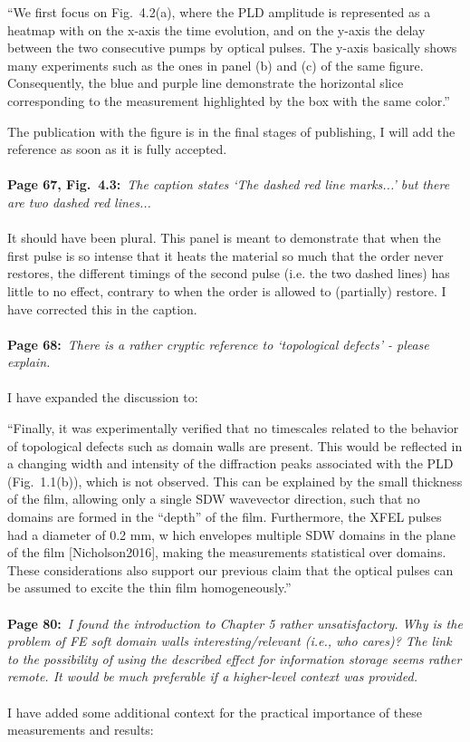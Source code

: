 \documentclass[a4, UTF8]{article}
\begin{document}
``We first focus on Fig.~4.2(a), where the PLD amplitude is represented as a heatmap with on the x-axis the time evolution, and on the y-axis the delay between the two consecutive pumps by optical pulses. The y-axis basically shows many experiments such as the ones in panel (b) and (c) of the same figure. Consequently, the blue and purple line demonstrate the horizontal slice corresponding to the measurement highlighted by the box with the same color.''

The publication with the figure is in the final stages of publishing, I will add the reference as soon as it is fully accepted.
\\\\
{\bf Page 67, Fig.~4.3:}~{\it The caption states `The dashed red line marks...’ but there are two dashed red lines...}
\\\\
It should have been plural. This panel is meant to demonstrate that when the first pulse is so intense that it heats the material so much that the order never restores, the different timings of the second pulse (i.e. the two dashed lines) has little to no effect, contrary to when the order is allowed to (partially) restore.
I have corrected this in the caption.
\\\\
{\bf Page 68:}~{\it There is a rather cryptic reference to `topological defects' - please explain.}
\\\\
I have expanded the discussion to:

``Finally, it was experimentally verified that no timescales related to the behavior of topological defects such as domain walls are present. This would be reflected in a changing width and intensity of the diffraction peaks associated with the PLD (Fig.~1.1(b)), which is not observed. This can be explained by the small thickness of the film, allowing only a single SDW wavevector direction, such that no domains are formed in the ``depth'' of the film. Furthermore, the XFEL pulses had a diameter of 0.2 mm, w hich envelopes multiple SDW domains in the plane of the film [Nicholson2016], making the measurements statistical over domains.
These considerations also support our previous claim that the optical pulses can be assumed to excite the thin film homogeneously.''
\\\\
{\bf Page 80:}~{\it I found the introduction to Chapter 5 rather unsatisfactory. Why is the problem of FE soft domain walls interesting/relevant (i.e., who cares)? The link to the possibility of using the described effect for information storage seems rather remote. It would be much preferable if a
higher-level context was provided.}
\\\\
I have added some additional context for the practical importance of these measurements and results:
\end{document}
